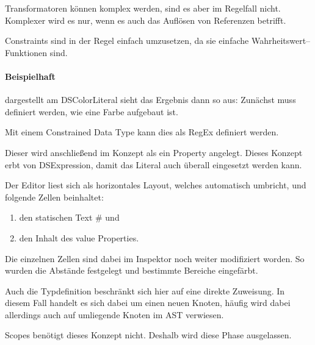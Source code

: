 Transformatoren können komplex werden, sind es aber im Regelfall nicht.
Komplexer wird es nur, wenn es auch das Auflösen von Referenzen betrifft.

Constraints sind in der Regel einfach umzusetzen, da sie einfache Wahrheitswert--Funktionen sind.

\paragraph{Beispielhaft} dargestellt am {\ttfamily DSColorLiteral} sieht das Ergebnis dann so aus:
Zunächst muss definiert werden, wie eine Farbe aufgebaut ist.

Mit einem {\ttfamily Constrained Data Type} kann dies als \ac{RegEx} definiert werden.


Dieser wird anschließend im Konzept als ein Property angelegt.
Dieses Konzept erbt von {\ttfamily DSExpression}, damit das Literal auch überall eingesetzt werden kann.


Der Editor liest sich als horizontales Layout, welches automatisch umbricht, und folgende Zellen beinhaltet:
\begin{enumerate}
    \item den statischen Text {\ttfamily \#} und
    \item den Inhalt des {\ttfamily value} Properties.
\end{enumerate}
Die einzelnen Zellen sind dabei im Inspektor noch weiter modifiziert worden.
So wurden die Abstände festgelegt und bestimmte Bereiche eingefärbt.


Auch die Typdefinition beschränkt sich hier auf eine direkte Zuweisung.
In diesem Fall handelt es sich dabei um einen neuen Knoten, häufig wird dabei allerdings auch auf umliegende Knoten im \ac{AST} verwiesen.

Scopes benötigt dieses Konzept nicht.
Deshalb wird diese Phase ausgelassen.

